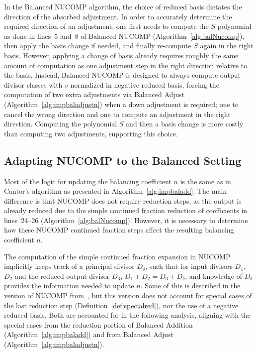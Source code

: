 In the Balanced NUCOMP algorithm, the choice of reduced basis dictates the
direction of the absorbed adjustment. In order to accurately determine the
required direction of an adjustment, one first needs to compute the $S$ polynomial
as done in lines~5 and~8 of Balanced NUCOMP (Algorithm~\ref{alg:balNucomp}), then apply the
basis change if needed, and finally re-compute $S$ again in the right basis.
However, applying a change of basis already requires roughly the same amount
of computation as one adjustment step in the right direction relative to the
basis. Instead, Balanced NUCOMP is designed to always compute output divisor
classes with $v$ normalized in negative reduced basis, forcing the computation
of two extra adjustments via Balanced Adjust (Algorithm~\ref{alg:impbaladjustn}) when a down
adjustment is required; one to cancel the wrong direction and one to compute an
adjustment in the right direction. Computing the polynomial $S$ and then a basis
change is more costly than computing two adjustments, supporting this choice.


\subsection{Adapting NUCOMP to the Balanced Setting}
\label{sec:adaptingNUCOMP}
Most of the logic for updating the balancing coefficient $n$ is the same as in
Cantor's algorithm as presented in Algorithm~\ref{alg:impbaladd}.  The main
difference is that NUCOMP does not require reduction steps, as the output is
already reduced due to the simple continued fraction reduction of coefficients
in lines~24--26 (Algorithm~\ref{alg:balNucomp}).  However, it is necessary to
determine how these NUCOMP continued fraction steps affect the resulting
balancing coefficient $n$. 

The computation of the simple continued fraction expansion in NUCOMP implicitly
keeps track of a principal divisor $D_{\delta}$, such that for input divisors
$D_1$, $D_2$ and the reduced output divisor $D_3$, $D_1 + D_2 = D_3 +
D_{\delta}$, and knowledge of $D_{\delta}$ provides the information needed to update
$n$.  Some of this is described in the version of NUCOMP
from~\cite{jacobson_fast_2007}, but this version does not account for special
cases of the last reduction step (Definition~\ref{def:specialred}), nor the use
of a negative reduced basis.  Both are accounted for in the following analysis,
aligning with the special cases from the reduction portion of Balanced Addition
(Algorithm~\ref{alg:impbaladd}) and from Balanced Adjust
(Algorithm~\ref{alg:impbaladjustn}). 

